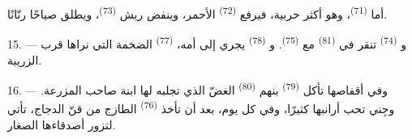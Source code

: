 أما  \textsuperscript{(71)}، وهو أكثر حربية، فيرفع 
\textsuperscript{(72)} الأحمر، وينفض ريش  \textsuperscript{(73)}، ويطلق
صياحًا رنّانًا.

15. --- و \textsuperscript{(74)} تنقر في 
\textsuperscript{(81)} مع  \textsuperscript{(75)}. و \textsuperscript{(78)} يجري إلى أمه،  \textsuperscript{(77)}
الضخمة التي نراها قرب الزريبة.

16. --- وفي أقفاصها تأكل  \textsuperscript{(79)} بنهم
 \textsuperscript{(80)} الغضّ الذي تجلبه لها ابنة صاحب المزرعة.
وجِني تحب أرانبها كثيرًا، وفي كل يوم، بعد أن تأخذ 
\textsuperscript{(76)} الطازج من قنّ الدجاج، تأتي لتزور أصدقاءها الصغار.
\VUsaut{6.0mm}
\VUfilet{22mm}
